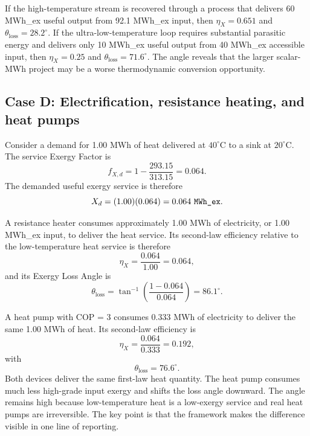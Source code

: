\documentclass[11pt]{article}
\newcommand{\thetaloss}{\theta_{\mathrm{loss}}}
\newcommand{\degC}{^{\circ}\mathrm{C}}
\begin{document}
If the high-temperature stream is recovered through a process that delivers 60 MWh\_ex useful output from 92.1 MWh\_ex input, then $\eta_X=0.651$ and $\theta_{\mathrm{loss}}=28.2^{\circ}$. If the ultra-low-temperature loop requires substantial parasitic energy and delivers only 10 MWh\_ex useful output from 40 MWh\_ex accessible input, then $\eta_X=0.25$ and $\theta_{\mathrm{loss}}=71.6^{\circ}$. The angle reveals that the larger scalar-MWh project may be a worse thermodynamic conversion opportunity.

\subsection*{Case D: Electrification, resistance heating, and heat pumps}

Consider a demand for 1.00 MWh of heat delivered at $40\degC$ to a sink at $20\degC$. The service Exergy Factor is
\begin{equation}
f_{X,d}=1-\frac{293.15}{313.15}=0.064.
\end{equation}
The demanded useful exergy service is therefore
\begin{equation}
X_d=(1.00)(0.064)=0.064\ \text{\texttt{MWh\_ex}}.
\end{equation}

A resistance heater consumes approximately 1.00 MWh of electricity, or 1.00 MWh\_ex input, to deliver the heat service. Its second-law efficiency relative to the low-temperature heat service is therefore
\begin{equation}
\eta_X=\frac{0.064}{1.00}=0.064,
\end{equation}
and its Exergy Loss Angle is
\begin{equation}
\thetaloss=\tan^{-1}\left(\frac{1-0.064}{0.064}\right)=86.1^{\circ}.
\end{equation}

A heat pump with COP = 3 consumes 0.333 MWh of electricity to deliver the same 1.00 MWh of heat. Its second-law efficiency is
\begin{equation}
\eta_X=\frac{0.064}{0.333}=0.192,
\end{equation}
with
\begin{equation}
\thetaloss=76.6^{\circ}.
\end{equation}
Both devices deliver the same first-law heat quantity. The heat pump consumes much less high-grade input exergy and shifts the loss angle downward. The angle remains high because low-temperature heat is a low-exergy service and real heat pumps are irreversible. The key point is that the framework makes the difference visible in one line of reporting.
\end{document}

